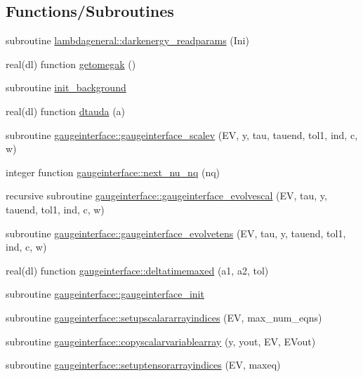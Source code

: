 \subsection*{Functions/\+Subroutines}
\begin{DoxyCompactItemize}
\item 
subroutine \mbox{\hyperlink{namespacelambdageneral_a780328d728ca15af725d6f53b2fa54d1}{lambdageneral\+::darkenergy\+\_\+readparams}} (Ini)
\item 
real(dl) function \mbox{\hyperlink{equations_8f90_a2c95a3b42a68aa87a21097ce3ff8bbe6}{getomegak}} ()
\item 
subroutine \mbox{\hyperlink{equations_8f90_a47540f6082acc64c78a1daac45637fd6}{init\+\_\+background}}
\item 
real(dl) function \mbox{\hyperlink{equations_8f90_a1c228811398a4401bb57d778911a13df}{dtauda}} (a)
\item 
subroutine \mbox{\hyperlink{namespacegaugeinterface_ac02938234bdca8dcd23649b1abb34ab3}{gaugeinterface\+::gaugeinterface\+\_\+scalev}} (EV, y, tau, tauend, tol1, ind, c, w)
\item 
integer function \mbox{\hyperlink{namespacegaugeinterface_ae317d979138ff46a65c14f787c0d749c}{gaugeinterface\+::next\+\_\+nu\+\_\+nq}} (nq)
\item 
recursive subroutine \mbox{\hyperlink{namespacegaugeinterface_a11f5c8bd6a22537e4a85362dc8dbf3af}{gaugeinterface\+::gaugeinterface\+\_\+evolvescal}} (EV, tau, y, tauend, tol1, ind, c, w)
\item 
subroutine \mbox{\hyperlink{namespacegaugeinterface_a048447959e15ae6dd9e887a61e135d0c}{gaugeinterface\+::gaugeinterface\+\_\+evolvetens}} (EV, tau, y, tauend, tol1, ind, c, w)
\item 
real(dl) function \mbox{\hyperlink{namespacegaugeinterface_aaf1e4804f8b140406e78f53f199433fa}{gaugeinterface\+::deltatimemaxed}} (a1, a2, tol)
\item 
subroutine \mbox{\hyperlink{namespacegaugeinterface_a59182efb978c657918dd88675b2ab0ef}{gaugeinterface\+::gaugeinterface\+\_\+init}}
\item 
subroutine \mbox{\hyperlink{namespacegaugeinterface_a50a72debb65475527ccc7e76af616083}{gaugeinterface\+::setupscalararrayindices}} (EV, max\+\_\+num\+\_\+eqns)
\item 
subroutine \mbox{\hyperlink{namespacegaugeinterface_a8565dc876beb9e4339c005a72333f31f}{gaugeinterface\+::copyscalarvariablearray}} (y, yout, EV, E\+Vout)
\item 
subroutine \mbox{\hyperlink{namespacegaugeinterface_a21f6d1e93445d43fc8247f57dce52716}{gaugeinterface\+::setuptensorarrayindices}} (EV, maxeq)

\end{DoxyCompactItemize}
